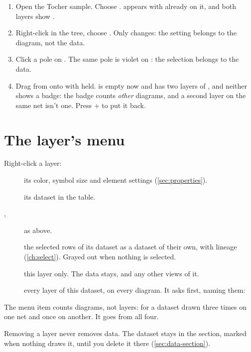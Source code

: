 \begin{tryit}
\begin{enumerate}
\item Open the Tocher sample. Choose .  appears with  already
on it, and both layers show .
\item Right-click  in the tree, choose . Only 
changes: the setting belongs to the diagram, not the data.
\item Click a pole on . The same pole is violet on : the selection belongs to the data.
\item Drag  from  onto  with  held.  is empty now and
 has two layers of , and neither shows a badge: the badge counts \emph{other}
diagrams, and a second layer on the same net isn't one. Press + to put it back.
\end{enumerate}
\end{tryit}

\section{The layer's menu}\label{sec:layer-menu}

Right-click a layer:

\begin{description}
\item[] its color, symbol size and element settings (\cref{sec:properties}).
\item[] its dataset in the table.
\item[, ] as above.
\item[] the selected rows of its dataset as a dataset of their own, with
lineage (\cref{ch:select}). Grayed out when nothing is selected.
\item[] this layer only. The data stays, and any other views of it.
\item[] every layer of this dataset, on every diagram. It asks first, naming
them: 
\end{description}

The menu item counts diagrams, not layers:  for a dataset drawn
three times on one net and once on another. It goes from all four.

Removing a layer never removes data. The dataset stays in the  section, marked 
when nothing draws it, until you delete it there (\cref{sec:data-section}).
